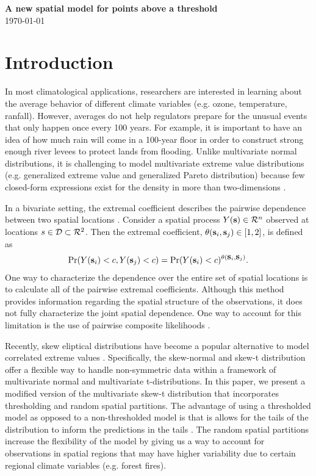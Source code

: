 \documentclass[11pt]{article}
\begin{document}
\linenumbers

\begin{center}
{\Large {\bf A new spatial model for points above a threshold}}\\
\today
\end{center}

\section{Introduction}\label{s:intro}
In most climatological applications, researchers are interested in learning about the average behavior of different climate variables (e.g. ozone, temperature, ranfall).
However, averages do not help regulators prepare for the unusual events that only happen once every 100 years.
For example, it is important to have an idea of how much rain will come in a 100-year floor in order to construct strong enough river levees to protect lands from flooding.
Unlike multivariate normal distributions, it is challenging to model multivariate extreme value distributions (e.g. generalized extreme value and generalized Pareto distribution) because few closed-form expressions exist for the density in more than two-dimensions \citep{Coles1991}.

In a bivariate setting, the extremal coefficient describes the pairwise dependence between two spatial locations \citep{Smith1990}.
Consider a spatial process $Y(\mbox{\bf s}) \in {\cal R}^n$ observed at locations $s \in {\cal D} \subset {\cal R}^2$.
Then the extremal coefficient, $\theta(\mbox{\bf s}_i, \mbox{\bf s}_j) \in [1, 2]$, is defined as
\begin{align}
  \Pr(Y(\mbox{\bf s}_i) < c, Y(\mbox{\bf s}_j) < c) = \Pr(Y(\mbox{\bf s}_i) < c)^{\theta(\mbox{\bf s}_i, \mbox{\bf s}_j) }. \label{eq:extremalcoef}
\end{align}
One way to characterize the dependence over the entire set of spatial locations is to calculate all of the pairwise extremal coefficients.
Although this method provides information regarding the spatial structure of the observations, it does not fully characterize the joint spatial dependence.
One way to account for this limitation is the use of pairwise composite likelihoods \citep{Padoan2010,Blanchet2011,Huser2013}.

Recently, skew eliptical distributions have become a popular alternative to model correlated extreme values \citep{Genton2004,Zhang2010,Padoan2011}.
Specifically, the skew-normal and skew-t distribution offer a flexible way to handle non-symmetric data within a framework of multivariate normal and multivariate t-distributions.
In this paper, we present a modified version of the multivariate skew-t distribution that incorporates thresholding and random spatial partitions.
The advantage of using a thresholded model as opposed to a non-thresholded model is that is allows for the tails of the distribution to inform the predictions in the tails \citep{DuMouchel1983}.
The random spatial partitions increase the flexibility of the model by giving us a way to account for observations in spatial regions that may have higher variability due to certain regional climate variables (e.g. forest fires).
\end{document}
